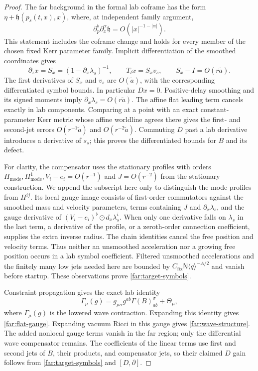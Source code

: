 \begin{proof}
The far background in the formal lab coframe has the form
$\eta+\mathfrak h(p_s(t,x),x)$, where, at independent family argument,
\[
 \partial_p^b\partial_x^\alpha\mathfrak h
                      =O(|x|^{-1-|\alpha|}).
\]
This statement includes the coframe change and holds for every member
of the chosen fixed Kerr parameter family.  Implicit differentiation of
the smoothed coordinates gives
\[
 \partial_zx=S_x=(1-\partial_x\lambda_s)^{-1},\qquad
 T_lx=S_xv_s,\qquad S_x-I=O(r\widetilde a).
\]
The first derivatives of $S_x$ and $v_s$ are $O(\widetilde a)$, with the
corresponding differentiated symbol bounds.  In particular $Dx=0$.
Positive-delay smoothing and its signed moments imply
$\partial_x\lambda_s=O(r\widetilde a)$.  The affine flat leading term
cancels exactly in lab components.  Comparing at a point with an exact
constant-parameter Kerr metric whose affine worldline agrees there gives
the first- and second-jet errors
$O(r^{-1}\widetilde a)$ and $O(r^{-2}\widetilde a)$.
Commuting $D$ past a lab derivative introduces a derivative of $s_s$;
this proves the differentiated bounds for $B$ and its defect.

For clarity, the compensator uses the stationary profiles with orders
$H_{\mathrm{mode}},H^1_{\mathrm{mode}},V_i-e_i=O(r^{-1})$ and
$J=O(r^{-2})$ from the stationary construction.  We append the subscript
here only to distinguish the mode profiles from $H^{ij}$.
Its local gauge image consists of first-order
commutators against the smoothed mass and velocity parameters, terms
containing $J$ and $\partial_x\lambda_s$, and the gauge derivative of
$(V_i-e_i)^\flat\odot d_x\lambda_s^i$.  When only one derivative falls
on $\lambda_s$ in the last term, a derivative of the profile, or a
zeroth-order connection coefficient, supplies the extra inverse radius.
The chain identities cancel the free position and velocity terms.
Thus neither an unsmoothed acceleration nor a growing free position
occurs in a lab symbol coefficient.  Filtered unsmoothed accelerations
and the finitely many low jets needed here are bounded by
$C_{\mathrm{fix}}\mathsf N\langle q\rangle^{-A/2}$ and vanish before
startup.  These observations prove \eqref{far:target-symbols}.

Constraint propagation gives the exact lab identity
\[
 \Gamma_\mu(g)=g_{\mu\sigma}g^{ab}\Gamma(B)^\sigma_{ab}+\Theta_\mu,
\]
where $\Gamma_\mu(g)$ is the lowered wave contraction.  Expanding this
identity gives \eqref{far:flat-gauge}.  Expanding vacuum Ricci in this
gauge gives \eqref{far:wave-structure}.  The added nonlocal gauge terms
vanish in the far region; only the differential wave compensator remains.
The coefficients of the linear terms use first and second jets of $B$,
their products, and compensator jets, so their claimed $D$ gain follows
from \eqref{far:target-symbols} and $[D,\partial]$.


\end{proof}
